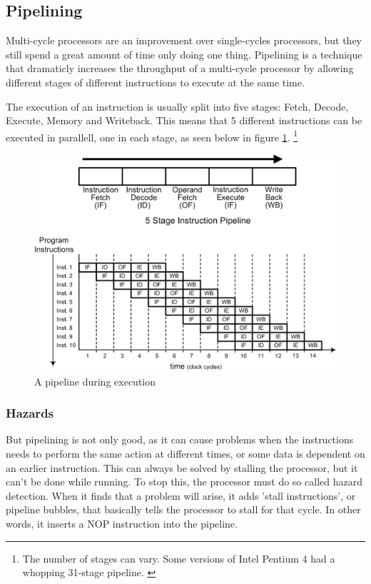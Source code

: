 \subsection{Pipelining}

Multi-cycle processors are an improvement over single-cycles processors, but they still spend a great amount of time only doing one thing.
Pipelining is a technique that dramaticly increases the throughput of a multi-cycle processor by allowing different stages of different instructions to execute at the same time.

The execution of an instruction is usually split into five stages:
Fetch, Decode, Execute, Memory and Writeback. 
This means that 5 different instructions can be executed in parallell,
one in each stage, as seen below in figure \ref{fig:pipeline}.
\footnote{
    The number of stages can vary.
    Some versions of Intel Pentium 4 had a whopping 31-stage pipeline.
    \cite{wiki-pentium4}
}

\begin{figure}[ht]
    \centering
    \includegraphics[width=\textwidth]{figures/pipeline2.png}
    \caption{A pipeline during execution} 
    \label{fig:pipeline}
\end{figure}

\subsubsection*{Hazards}
But pipelining is not only good, as it can cause problems when the instructions
needs to perform the same action at different times, or some data is dependent
on an earlier instruction. This can always be solved by stalling the processor, 
but it can't be done while running. To stop this, the processor must do so called 
hazard detection. When it finds that a problem will arise, it adds 'stall 
instructions', or pipeline bubbles, that basically tells the processor to stall 
for that cycle. In other words, it inserts a NOP instruction into the pipeline.

